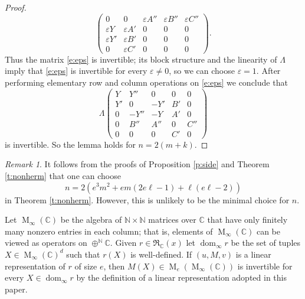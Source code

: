 \documentclass[12pt,a4paper]{amsart}
\DeclareMathOperator{\dom}{dom}
\DeclareMathOperator{\opm}{M}
\newcommand{\ve}{\varepsilon}
\newcommand{\N}{\mathbb{N}}
\newcommand{\C}{\mathbb{C}}
\newcommand{\cfm}{\opm_\infty(\C)}
\newcommand{\rex}{\mathfrak{R}_{\C}(x)}
\theoremstyle{definition}
\theoremstyle{remark}
\newtheorem{rem}[thm]{Remark}
\numberwithin{equation}{section}
\begin{document}
\begin{proof}
\begin{equation}
\begin{pmatrix}
 0 & 0 & \ve A''& \ve B'' & \ve C'' \\
 \ve Y  & \ve A' & 0 &0 &0 \\
 \ve Y' & \ve B' & 0 &0 &0 \\
 0 & \ve C' & 0 &0 &0
 \end{pmatrix}.
\end{equation}
Thus the matrix \eqref{e:eps} is invertible; its block structure and the linearity of $\Lambda$ imply that \eqref{e:eps} is invertible for every $\ve\neq0$, so we can choose $\ve=1$. After performing elementary row and column operations on \eqref{e:eps} we conclude that
\begin{equation}\label{e:mat5}
\Lambda
 \begin{pmatrix}
Y & Y'' & 0 & 0 &0 \\
 Y' & 0 & - Y' & B' &0 \\
0  & - Y'' & - Y &  A' &0 \\
0 & B'' &  A''& 0 & C'' \\
0 & 0 & 0 & C' &0
\end{pmatrix}
\end{equation}
is invertible. So the lemma holds for $n= 2(m+k)$.
\end{proof}

\begin{rem}\label{r:size}
It follows from the proofs of Proposition \ref{p:side} and Theorem \ref{t:nonherm} that one can choose
$$n= 2 \left(e^3 m^2+e m (2 e \ell-1)+\ell (e \ell-2)\right)$$
in Theorem \ref{t:nonherm}. However, this is unlikely to be the minimal choice for $n$.
\end{rem}

Let $\cfm$ be the algebra of $\N\times\N$ matrices over $\C$ that have only finitely many nonzero entries in each column; that is, elements of $\cfm$ can be viewed as operators on $\oplus^{\N}\C$. Given $r\in\rex$ let $\dom_\infty r$ be the set of tuples $X\in\cfm^d$ such that $r(X)$ is well-defined. If $(u,M,v)$ is a linear representation of $r$ of size $e$, then $M(X)\in\opm_e(\cfm)$ is invertible for every $X\in\dom_\infty r$ by the definition of a linear representation adopted in this paper.
\end{document}
